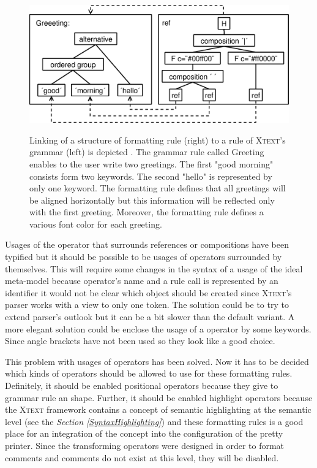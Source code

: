 \documentclass[12pt,notitlepage,a4paper]{report}
\begin{document}
\begin{figure}[h!]
\centering
\caption{Linking of a structure of formatting rule (right) to a rule of \textsc{Xtext}'s grammar (left) is depicted . The grammar rule called Greeting enables to the user write two greetings. The first "good morning" consists form two keywords. The second "hello" is represented by only one keyword. The formatting rule defines that all greetings will be aligned horizontally but this information will be reflected only with the first greeting. Moreover, the formatting rule defines a various font color for each greeting.}
\includegraphics[scale=0.51]{pictures/FormattingRuleStructure.eps}
\label{FormattingRuleStructure}
\end{figure}
\noindent

Usages of the operator that surrounds references or compositions have been typified but it should be possible to be usages of operators surrounded by themselves. This will require some changes in the syntax of a usage of the ideal meta-model because operator's name and a rule call is represented by an identifier it would not be clear which object should be created since \textsc{Xtext}'s parser works with a view to only one token. The solution could be to try to extend parser's outlook but it can be a bit slower than the default variant. A more elegant solution could be enclose the usage of a operator by some keywords. Since angle brackets have not been used so they look like a good choice. 

This problem with usages of operators has been solved. Now it has to be decided which kinds of operators should be allowed to use for these formatting rules. Definitely, it should be enabled positional operators because they give to grammar rule an shape. Further, it should be enabled highlight operators because the \textsc{Xtext} framework contains a concept of semantic highlighting at the semantic level (see the \textit{Section \ref{SyntaxHighlighting}}) and these formatting rules is a good place for an integration of the concept into the configuration of the pretty printer. Since the transforming operators were designed in order to format comments and comments do not exist at this level, they will be disabled.
\end{document}
